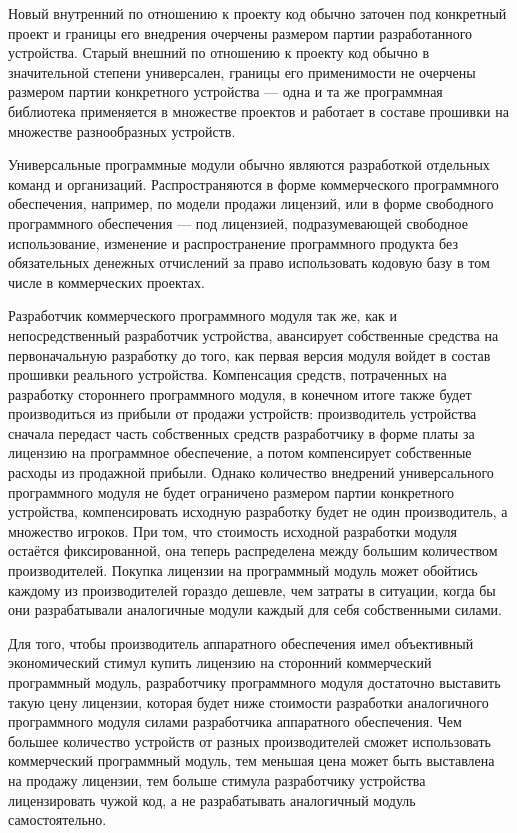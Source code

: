\documentclass{article}
\begin{document}
Новый внутренний по отношению к проекту код обычно заточен под конкретный проект и границы его внедрения очерчены размером партии разработанного устройства. Старый внешний по отношению к проекту код обычно в значительной степени универсален, границы его применимости не очерчены размером партии конкретного устройства — одна и та же программная библиотека применяется в множестве проектов и работает в составе прошивки на множестве разнообразных устройств.

Универсальные программные модули обычно являются разработкой отдельных команд и организаций. Распространяются в форме коммерческого программного обеспечения, например, по модели продажи лицензий, или в форме свободного программного обеспечения — под лицензией, подразумевающей свободное использование, изменение и распространение программного продукта без обязательных денежных отчислений за право использовать кодовую базу в том числе в коммерческих проектах.

Разработчик коммерческого программного модуля так же, как и непосредственный разработчик устройства, авансирует собственные средства на первоначальную разработку до того, как первая версия модуля войдет в состав прошивки реального устройства. Компенсация средств, потраченных на разработку стороннего программного модуля, в конечном итоге также будет производиться из прибыли от продажи устройств: производитель устройства сначала передаст часть собственных средств разработчику в форме платы за лицензию на программное обеспечение, а потом компенсирует собственные расходы из продажной прибыли. Однако количество внедрений универсального программного модуля не будет ограничено размером партии конкретного устройства, компенсировать исходную разработку будет не один производитель, а множество игроков. При том, что стоимость исходной разработки модуля остаётся фиксированной, она теперь распределена между большим количеством производителей. Покупка лицензии на программный модуль может обойтись каждому из производителей гораздо дешевле, чем затраты в ситуации, когда бы они разрабатывали аналогичные модули каждый для себя собственными силами.

Для того, чтобы производитель аппаратного обеспечения имел объективный экономический стимул купить лицензию на сторонний коммерческий программный модуль, разработчику программного модуля достаточно выставить такую цену лицензии, которая будет ниже стоимости разработки аналогичного программного модуля силами разработчика аппаратного обеспечения. Чем большее количество устройств от разных производителей сможет использовать коммерческий программный модуль, тем меньшая цена может быть выставлена на продажу лицензии, тем больше стимула разработчику устройства лицензировать чужой код, а не разрабатывать аналогичный модуль самостоятельно.
\end{document}
